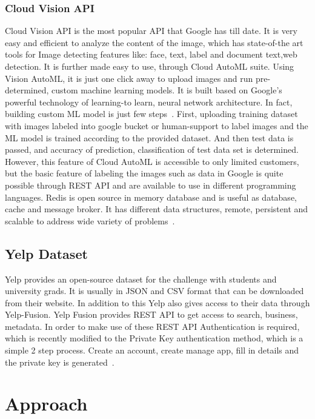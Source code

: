 \subsubsection{Cloud Vision API} 

Cloud Vision API is the most popular API that Google has till date. It
is very easy and efficient to analyze the content of the image, which
has state-of-the art tools for Image detecting features like: face,
text, label and document text,web detection.  It is further made easy
to use, through Cloud AutoML suite. Using Vision AutoML, it is just
one click away to upload images and run pre-determined, custom machine
learning models. It is built based on Google’s powerful technology of
learning-to learn, neural network architecture. In fact, building
custom ML model is just few
steps~\cite{hid-sp18-602-cloud-automl}. First, uploading training
dataset with images labeled into google bucket or human-support to
label images and the ML model is trained according to the provided
dataset. And then test data is passed, and accuracy of prediction,
classification of test data set is determined. However, this feature
of Cloud AutoML is accessible to only limited customers, but the basic
feature of labeling the images such as data in Google is quite
possible through REST API and are available to use in different
programming languages.  Redis is open source in memory database and is
useful as database, cache and message broker. It has different data
structures, remote, persistent and scalable to address wide variety of
problems~\cite{hid-sp18-602-cloud-vision}.

\subsection{Yelp Dataset}

Yelp provides an open-source dataset for the challenge with students
and university grads. It is usually in JSON and CSV format that can be
downloaded from their website. In addition to this Yelp also gives
access to their data through Yelp-Fusion. Yelp Fusion provides REST
API to get access to search, business, metadata. In order to make use
of these REST API Authentication is required, which is recently
modified to the Private Key authentication method, which is a simple 2
step process. Create an account, create manage app, fill in details
and the private key is generated~\cite{hid-sp18-602-yelp}.

\section{Approach}

